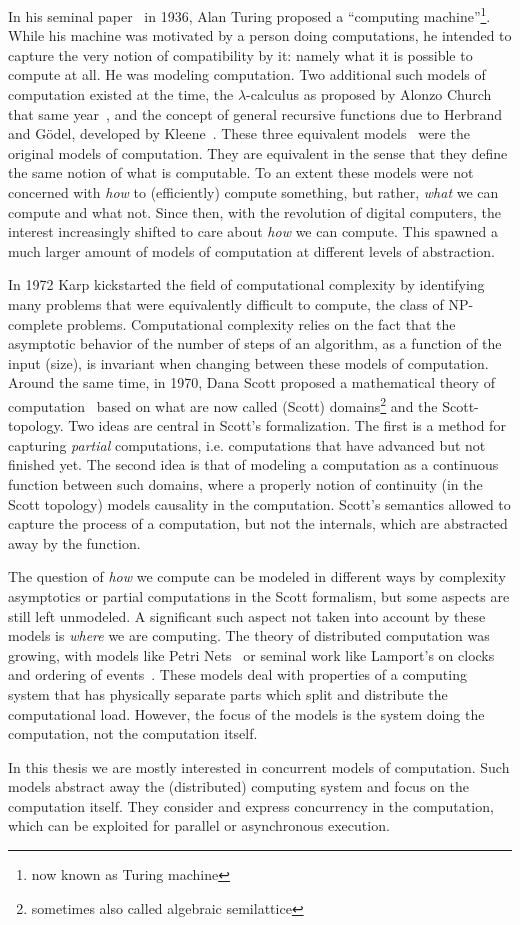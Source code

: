 In his seminal paper~\cite{turing1936computable} in 1936, Alan Turing proposed a ``computing machine''\footnote{now known as Turing machine}.   
While his machine was motivated by a person doing computations, he intended to capture the very notion of compatibility by it: namely what it is possible to compute at all.
He was modeling computation.
Two additional such models of computation existed at the time, the $\lambda$-calculus as proposed by Alonzo Church that same year~\cite{church1936unsolvable}, and the concept of general recursive functions due to Herbrand and Gödel, developed by Kleene~\cite{kleene1936recursive}.
These three equivalent models~\cite{turing1937computability} were the original models of computation.
They are equivalent in the sense that they define the same notion of what is computable.
To an extent these models were not concerned with \emph{how} to (efficiently) compute something, but rather, \emph{what} we can compute and what not.
Since then, with the revolution of digital computers, the interest increasingly shifted to care about \emph{how} we can compute.
This spawned a much larger amount of models of computation at different levels of abstraction.

In 1972 Karp\cite{karp1972reducibility} kickstarted the field of computational complexity by identifying many problems that were equivalently difficult to compute, the class of NP-complete problems.
Computational complexity relies on the fact that the asymptotic behavior of the number of steps of an algorithm, as a function of the input (size), is invariant when changing between these models of computation.
Around the same time, in 1970, Dana Scott proposed a mathematical theory of computation~\cite{scott1970} based on what are now called (Scott) domains\footnote{sometimes also called algebraic semilattice} and the Scott-topology. 
Two ideas are central in Scott's formalization. The first is a method for capturing \emph{partial} computations, i.e. computations that have advanced but not finished yet.
The second idea is that of modeling a computation as a continuous function between such domains, where a properly notion of continuity (in the Scott topology) models causality in the computation.
Scott's semantics allowed to capture the process of a computation, but not the internals, which are abstracted away by the function. 

The question of \emph{how} we compute can be modeled in different ways by complexity asymptotics or partial computations in the Scott formalism, but some aspects are still left unmodeled.
A significant such aspect not taken into account by these models is \emph{where} we are computing.
The theory of distributed computation was growing, with models like Petri Nets~\cite{petri1962nets} or seminal work like Lamport's on clocks and ordering of events~\cite{Lamport78time}.
These models deal with properties of a computing system that has physically separate parts which split and distribute the computational load.
However, the focus of the models is the system doing the computation, not the computation itself.

In this thesis we are mostly interested in concurrent models of computation. 
Such models abstract away the (distributed) computing system and focus on the computation itself. 
They consider and express concurrency in the computation, which can be exploited for parallel or asynchronous execution.
